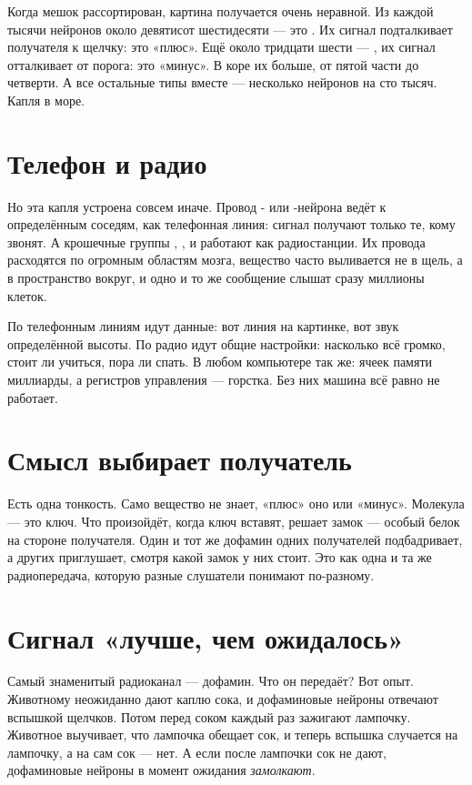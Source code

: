 Когда мешок рассортирован, картина получается очень неравной. Из каждой тысячи нейронов около девятисот шестидесяти --- это . Их сигнал подталкивает получателя к щелчку: это «плюс». Ещё около тридцати шести --- , их сигнал отталкивает от порога: это «минус». В коре их больше, от пятой части до четверти. А все остальные типы вместе --- несколько нейронов на сто тысяч. Капля в море.

\section*{Телефон и радио}

Но эта капля устроена совсем иначе. Провод - или -нейрона ведёт к определённым соседям, как телефонная линия: сигнал получают только те, кому звонят. А крошечные группы , ,  и  работают как радиостанции. Их провода расходятся по огромным областям мозга, вещество часто выливается не в щель, а в пространство вокруг, и одно и то же сообщение слышат сразу миллионы клеток.

По телефонным линиям идут данные: вот линия на картинке, вот звук определённой высоты. По радио идут общие настройки: насколько всё громко, стоит ли учиться, пора ли спать. В любом компьютере так же: ячеек памяти миллиарды, а регистров управления --- горстка. Без них машина всё равно не работает.

\section*{Смысл выбирает получатель}

Есть одна тонкость. Само вещество не знает, «плюс» оно или «минус». Молекула --- это ключ. Что произойдёт, когда ключ вставят, решает замок --- особый белок на стороне получателя. Один и тот же дофамин одних получателей подбадривает, а других приглушает, смотря какой замок у них стоит. Это как одна и та же радиопередача, которую разные слушатели понимают по-разному.

\section*{Сигнал «лучше, чем ожидалось»}

Самый знаменитый радиоканал --- дофамин. Что он передаёт? Вот опыт. Животному неожиданно дают каплю сока, и дофаминовые нейроны отвечают вспышкой щелчков. Потом перед соком каждый раз зажигают лампочку. Животное выучивает, что лампочка обещает сок, и теперь вспышка случается на лампочку, а на сам сок --- нет. А если после лампочки сок не дают, дофаминовые нейроны в момент ожидания \emph{замолкают}.

